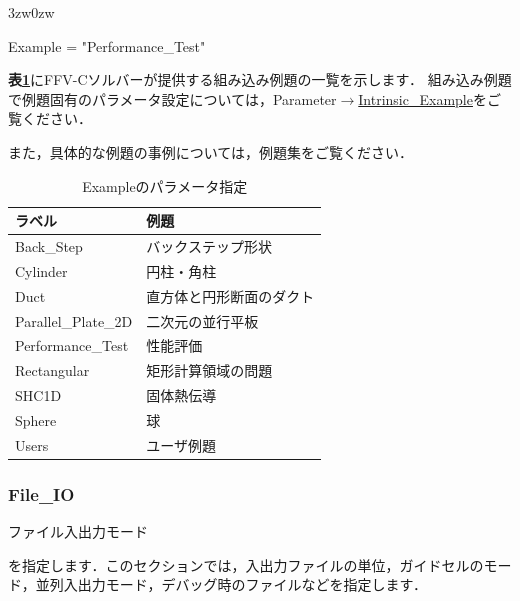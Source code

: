 \begin{indentation}{3zw}{0zw}

{\small
\begin{program}
  Example = "Performance_Test"
\end{program}
}

\textbf{表\ref{tbl:intrinsic_example}}にFFV-Cソルバーが提供する組み込み例題の一覧を示します．
組み込み例題で例題固有のパラメータ設定については，Parameter$\to$\hyperlink{tgt:intrinsic_example}{Intrinsic\_Example}をご覧ください．

また，具体的な例題の事例については，例題集をご覧ください．

\begin{table}[htdp]
\caption{Exampleのパラメータ指定}
\begin{center}
\small
\begin{tabular}{ll} \toprule
ラベル & 例題\\ \midrule
Back\_Step & バックステップ形状\\
Cylinder & 円柱・角柱\\
Duct & 直方体と円形断面のダクト\\
Parallel\_Plate\_2D & 二次元の並行平板\\
Performance\_Test & 性能評価\\
Rectangular & 矩形計算領域の問題\\
SHC1D & 固体熱伝導\\ 
Sphere & 球\\ 
Users & ユーザ例題\\ \bottomrule
\end{tabular}
\end{center}
\label{tbl:intrinsic_example}
\end{table}

\end{indentation}


\pagebreak
\subsubsection{File\_IO}

\hypertarget{tgt:fileio}{ファイル入出力モード}を指定します．このセクションでは，入出力ファイルの単位，ガイドセルのモード，並列入出力モード，デバッグ時のファイルなどを指定します．

